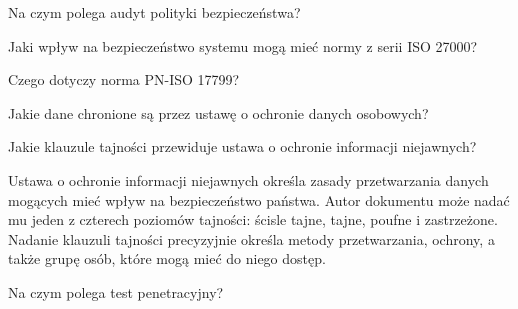 \documentclass[answers,11pt]{exam}
\begin{document}
\begin{questions}
\question Na czym polega audyt polityki bezpieczeństwa?

\question Jaki wpływ na bezpieczeństwo systemu mogą mieć normy z serii ISO 27000?

\question Czego dotyczy norma PN-ISO 17799?

\question Jakie dane chronione są przez ustawę o ochronie danych osobowych?

\question Jakie klauzule tajności przewiduje ustawa o ochronie informacji niejawnych?
\begin{solution}
Ustawa o ochronie informacji niejawnych określa zasady przetwarzania danych mogących mieć wpływ na bezpieczeństwo państwa. Autor dokumentu może nadać mu jeden z czterech poziomów tajności: ścisle tajne, tajne, poufne i zastrzeżone. Nadanie klauzuli tajności precyzyjnie określa metody przetwarzania, ochrony, a także grupę osób, które mogą mieć do niego dostęp. 
\end{solution}


\question Na czym polega test penetracyjny?


\end{questions}
\end{document}
